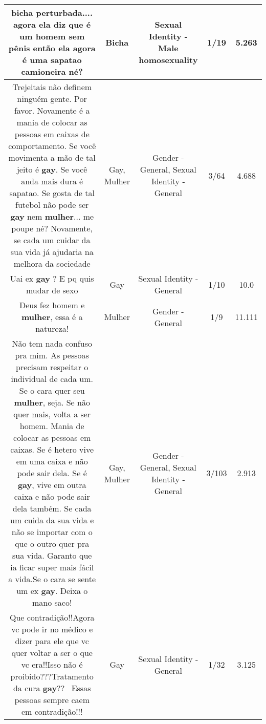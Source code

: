 \documentclass[11pt]{article}
\newlength\mylength
\begin{document}
\begin{center}
\begin{longtable}{|C{.65\mylength}|C{.30\mylength}|C{.12\mylength}|C{.12\mylength}|C{.12\mylength}|}
  \small bicha perturbada.... agora ela diz que é um homem sem pênis então ela agora é uma sapatao camioneira né?\normalsize   & Bicha & Sexual Identity - Male homosexuality & 1/19 & 5.263 \\  \hline
  \small Trejeitais não definem ninguém gente. Por favor. Novamente é a mania de colocar as pessoas em caixas de comportamento. Se você movimenta a mão de tal jeito é \textbf{gay}. Se você anda mais dura é sapatao. Se gosta de tal futebol não pode ser \textbf{gay} nem \textbf{mulher}... me poupe né? Novamente, se cada um cuidar da sua vida já ajudaria na melhora da sociedade\normalsize   & Gay, Mulher & Gender - General, Sexual Identity - General & 3/64 & 4.688 \\  \hline
  \small Uai ex \textbf{gay} ? E pq quis mudar de sexo\normalsize   & Gay & Sexual Identity - General & 1/10 & 10.0 \\  \hline
  \small Deus fez homem e \textbf{mulher}, essa é  a natureza!\normalsize   & Mulher & Gender - General & 1/9 & 11.111 \\  \hline
  \small Não tem nada confuso pra mim. As pessoas precisam respeitar o individual de cada um. Se o cara quer seu \textbf{mulher}, seja. Se não quer mais, volta a ser homem. Mania de colocar as pessoas em caixas. Se é hetero vive em uma caixa e não pode sair dela. Se é \textbf{gay}, vive em outra caixa e não pode sair dela também. Se cada um cuida da sua vida e não se importar com o que o outro quer pra sua vida. Garanto que ia ficar super mais fácil a vida.Se o cara se sente um ex \textbf{gay}. Deixa o mano saco!\normalsize   & Gay, Mulher & Gender - General, Sexual Identity - General & 3/103 & 2.913 \\  \hline
  \small Que contradição!!Agora vc pode ir no médico e dizer para ele que vc quer voltar a ser o que vc era!!Isso não é proibido???Tratamento da cura \textbf{gay}??🤣🤣🤣Essas pessoas sempre caem em contradição!!!\normalsize   & Gay & Sexual Identity - General & 1/32 & 3.125 \\  \hline

\end{longtable}
\end{center}
\end{document}
